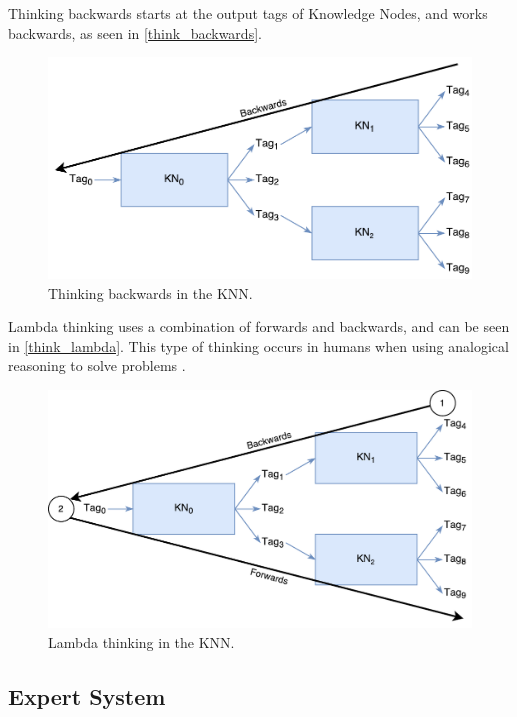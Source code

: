 \documentclass[titlepage,11pt]{article}
\begin{document}
Thinking backwards starts at the output tags of Knowledge Nodes, and works backwards, as seen in \autoref{think_backwards}.

\begin{figure}[!htb]
	\includegraphics[width=\columnwidth]{figures/backwards_thinking.pdf}
	\caption{Thinking backwards in the KNN.}
	\label{think_backwards}
\end{figure}

Lambda thinking uses a combination of forwards and backwards, and can be seen in \autoref{think_lambda}. This type of thinking occurs in humans when using analogical reasoning to solve problems \cite{vybihal-lambda}.

\begin{figure}[!htb]
\includegraphics[width=\columnwidth]{figures/lambda_thinking.pdf}
\caption{Lambda thinking in the KNN.}
\label{think_lambda}
\end{figure}

\subsection{Expert System}
\end{document}
